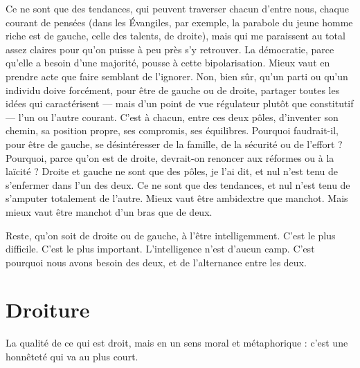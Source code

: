 Ce ne sont que des tendances, qui peuvent traverser chacun d’entre nous,
chaque courant de pensées (dans les Évangiles, par exemple, la parabole du
jeune homme riche est de gauche, celle des talents, de droite), mais qui me
paraissent au total assez claires pour qu’on puisse à peu près s’y retrouver. La
démocratie, parce qu’elle a besoin d’une majorité, pousse à cette bipolarisation.
Mieux vaut en prendre acte que faire semblant de l’ignorer. Non, bien sûr,
qu’un parti ou qu’un individu doive forcément, pour être de gauche ou de
droite, partager toutes les idées qui caractérisent — mais d’un point de vue régulateur
plutôt que constitutif — l’un ou l’autre courant. C’est à chacun, entre ces
deux pôles, d'inventer son chemin, sa position propre, ses compromis, ses équilibres.
Pourquoi faudrait-il, pour être de gauche, se désintéresser de la famille,
de la sécurité ou de l'effort ? Pourquoi, parce qu’on est de droite, devrait-on
renoncer aux réformes ou à la laïcité ? Droite et gauche ne sont que des pôles,
je l’ai dit, et nul n’est tenu de s’enfermer dans l’un des deux. Ce ne sont que des
tendances, et nul n’est tenu de s’amputer totalement de l’autre. Mieux vaut être
ambidextre que manchot. Mais mieux vaut être manchot d’un bras que de
deux.

Reste, qu’on soit de droite ou de gauche, à l’être intelligemment. C’est le
plus difficile. C’est le plus important. L'intelligence n’est d’aucun camp. C’est
pourquoi nous avons besoin des deux, et de l’alternance entre les deux.

\section{Droiture}
La qualité de ce qui est droit, mais en un sens moral et métaphorique :
c’est une honnêteté qui va au plus court.

